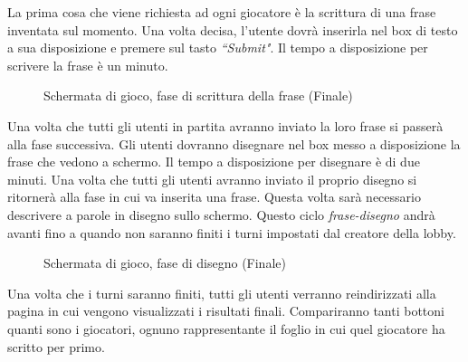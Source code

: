 \noindent La prima cosa che viene richiesta ad ogni giocatore è la scrittura di una frase inventata sul momento. Una volta decisa, l'utente dovrà inserirla nel box di testo a sua disposizione e premere sul tasto \textit{``Submit"}. Il tempo a disposizione per scrivere la frase è un minuto.
\begin{figure}[H]
    \caption{Schermata di gioco, fase di scrittura della frase (Finale)}
    \centering
    \label{fig:sentence_screen}
\end{figure}

\noindent Una volta che tutti gli utenti in partita avranno inviato la loro frase si passerà alla fase successiva. Gli utenti dovranno disegnare nel box messo a disposizione la frase che vedono a schermo. Il tempo a disposizione per disegnare è di due minuti. Una volta che tutti gli utenti avranno inviato il proprio disegno si ritornerà alla fase in cui va inserita una frase. Questa volta sarà necessario descrivere a parole in disegno sullo schermo. Questo ciclo \textit{frase-disegno} andrà avanti fino a quando non saranno finiti i turni impostati dal creatore della lobby.

\begin{figure}[H]
    \caption{Schermata di gioco, fase di disegno (Finale)}
    \centering
    \label{fig:draw_screen}
\end{figure}
 \noindent Una volta che i turni saranno finiti, tutti gli utenti verranno reindirizzati alla pagina in cui vengono visualizzati i risultati finali. Compariranno tanti bottoni quanti sono i giocatori, ognuno rappresentante il foglio in cui quel giocatore ha scritto per primo.

